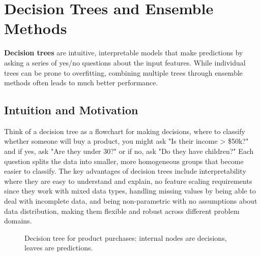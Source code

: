 
\section{Decision Trees and Ensemble Methods }
\label{sec:decision-trees}

\textbf{Decision trees} are intuitive, interpretable models that make predictions by asking a series of yes/no questions about the input features. While individual trees can be prone to overfitting, combining multiple trees through ensemble methods often leads to much better performance.

\subsection{Intuition and Motivation}

Think of a decision tree as a flowchart for making decisions, where to classify whether someone will buy a product, you might ask "Is their income > \$50k?" and if yes, ask "Are they under 30?" or if no, ask "Do they have children?" Each question splits the data into smaller, more homogeneous groups that become easier to classify. The key advantages of decision trees include interpretability where they are easy to understand and explain, no feature scaling requirements since they work with mixed data types, handling missing values by being able to deal with incomplete data, and being non-parametric with no assumptions about data distribution, making them flexible and robust across different problem domains.

\begin{figure}[htbp]
\centering
{}
\caption{Decision tree for product purchases: internal nodes are decisions, leaves are predictions.}
\label{fig:decision-tree-example}
\end{figure}

